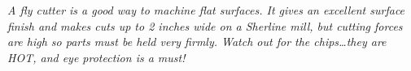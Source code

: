 \bigskip
\textit{A fly cutter is a good way to machine flat surfaces. It gives an
excellent surface finish and makes cuts up to 2 inches wide on a Sherline mill,
but cutting forces are high so parts must be held very firmly. Watch out for the
chips\ldots they are HOT, and eye protection is a must!}
\bigskip

\secup

\secup
